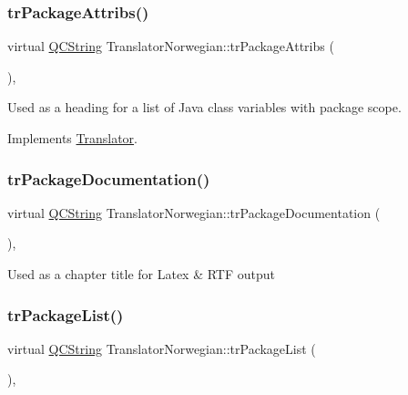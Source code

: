 \subsubsection{\texorpdfstring{trPackageAttribs()}{trPackageAttribs()}}
{\footnotesize\ttfamily virtual \mbox{\hyperlink{class_q_c_string}{Q\+C\+String}} Translator\+Norwegian\+::tr\+Package\+Attribs (\begin{DoxyParamCaption}{ }\end{DoxyParamCaption})\hspace{0.3cm}{\ttfamily [inline]}, {\ttfamily [virtual]}}

Used as a heading for a list of Java class variables with package scope. 

Implements \mbox{\hyperlink{class_translator}{Translator}}.

\mbox{\label{class_translator_norwegian_a15329bbb12d3758100a967929612ed09}} 
\subsubsection{\texorpdfstring{trPackageDocumentation()}{trPackageDocumentation()}}
{\footnotesize\ttfamily virtual \mbox{\hyperlink{class_q_c_string}{Q\+C\+String}} Translator\+Norwegian\+::tr\+Package\+Documentation (\begin{DoxyParamCaption}{ }\end{DoxyParamCaption})\hspace{0.3cm}{\ttfamily [inline]}, {\ttfamily [virtual]}}

Used as a chapter title for Latex \& R\+TF output \mbox{\label{class_translator_norwegian_a7bc92ccd5f87e67b3814041d1cea7494}} 
\subsubsection{\texorpdfstring{trPackageList()}{trPackageList()}}
{\footnotesize\ttfamily virtual \mbox{\hyperlink{class_q_c_string}{Q\+C\+String}} Translator\+Norwegian\+::tr\+Package\+List (\begin{DoxyParamCaption}{ }\end{DoxyParamCaption})\hspace{0.3cm}{\ttfamily [inline]}, {\ttfamily [virtual]}}

